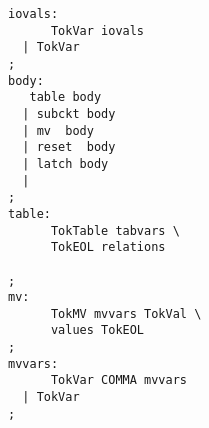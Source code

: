 \begin{minipage}[h]{2in}
\scriptsize
\begin{verbatim}
iovals:
      TokVar iovals
  | TokVar
;
body:
   table body
  | subckt body
  | mv  body
  | reset  body
  | latch body
  |
;
table:
      TokTable tabvars \
      TokEOL relations

;
mv:
      TokMV mvvars TokVal \
      values TokEOL
;
mvvars:
      TokVar COMMA mvvars
  | TokVar
;
\end{verbatim}
\end{minipage}
